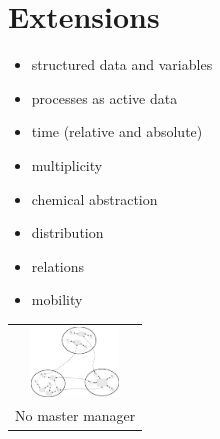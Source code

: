 \documentclass[portrait,final,a0paper]{nadiposter}
\newcommand{\compresslist}{%
\setlength{\itemsep}{1pt}%
\setlength{\parskip}{0pt}%
\setlength{\parsep}{0pt}%
\setlength{\leftmargin}{0pt}%
}
\begin{document}
\begin{poster}
{\begin{multicols}{2}
\end{multicols}

\section*{Extensions}

\begin{multicols}{3}

\begin{itemize}
\compresslist

\item structured data and variables
\item processes as active data
\item time (relative and absolute)
\item multiplicity

\end{itemize}

\begin{itemize}
\compresslist

\item chemical abstraction
\item distribution
\item relations
\item mobility

\end{itemize}

\begin{center}
\begin{tabular}{c}
\includegraphics[height=5em]{images/mu2log.pdf} \\
No master manager
\end{tabular}
\end{center}



\end{multicols}

}

\end{poster}
\end{document}
